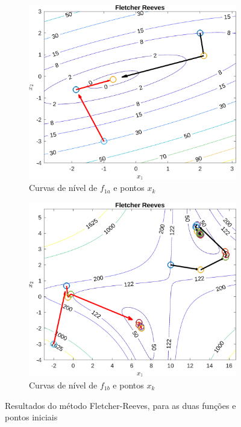 \documentclass[10pt, a4paper]{article}
\begin{document}
\begin{figure}[H]
      \centering
      \begin{subfigure}{0.45\textwidth}
            \includegraphics[width=\textwidth]{img01A_m04.png}
            \caption{Curvas de n\'ivel de $f_{1a}$ e pontos $x_{k}$}
            \label{fig:graf01A_m04}
      \end{subfigure}
      \begin{subfigure}{0.45\textwidth}
            \centering
            \includegraphics[width=\textwidth]{img01B_m04.png}
            \caption{Curvas de n\'ivel de $f_{1b}$ e pontos $x_{k}$}
            \label{fig:graf01B_m04}
      \end{subfigure}
      \caption{Resultados do m\'etodo Fletcher-Reeves, para as duas fun\c c\~oes e pontos iniciais}
      \label{fig:graf01_m04}
\end{figure}
\end{document}
